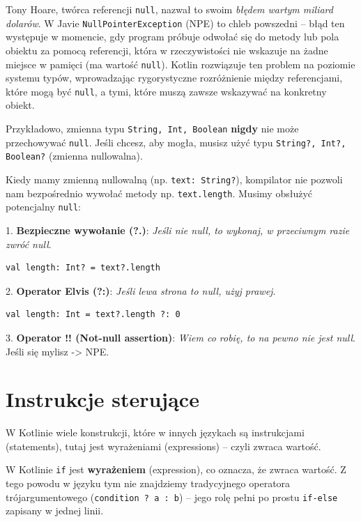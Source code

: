 Tony Hoare, twórca referencji \texttt{null}, nazwał to swoim \textit{błędem wartym miliard dolarów}. W Javie \texttt{NullPointerException} (NPE) to chleb powszedni – błąd ten występuje w momencie, gdy program próbuje odwołać się do metody lub pola obiektu za pomocą referencji, która w rzeczywistości nie wskazuje na żadne miejsce w pamięci (ma wartość \texttt{null}). Kotlin rozwiązuje ten problem na poziomie systemu typów, wprowadzając rygorystyczne rozróżnienie między referencjami, które mogą być \texttt{null}, a tymi, które muszą zawsze wskazywać na konkretny obiekt.

Przykładowo, zmienna typu \texttt{String, Int, Boolean} \textbf{nigdy} nie może przechowywać \texttt{null}. Jeśli chcesz, aby mogła, musisz użyć typu \texttt{String?, Int?, Boolean?} (zmienna nullowalna).

Kiedy mamy zmienną nullowalną (np. \texttt{text: String?}), kompilator nie pozwoli nam bezpośrednio wywołać metody np. \texttt{text.length}. Musimy obsłużyć potencjalny \texttt{null}:

1. \textbf{Bezpieczne wywołanie (?.)}: \textit{Jeśli nie null, to wykonaj, w przeciwnym razie zwróć null}.
\begin{verbatim}
val length: Int? = text?.length
\end{verbatim}

2. \textbf{Operator Elvis (?:)}: \textit{Jeśli lewa strona to null, użyj prawej}.
\begin{verbatim}
val length: Int = text?.length ?: 0
\end{verbatim}

3. \textbf{Operator !! (Not-null assertion)}: \textit{Wiem co robię, to na pewno nie jest null}. Jeśli się mylisz -> NPE.

\section{Instrukcje sterujące}

W Kotlinie wiele konstrukcji, które w innych językach są instrukcjami (statements), tutaj jest wyrażeniami (expressions) – czyli zwraca wartość.

W Kotlinie \texttt{if} jest \textbf{wyrażeniem} (expression), co oznacza, że zwraca wartość. Z tego powodu w języku tym nie znajdziemy tradycyjnego operatora trójargumentowego (\texttt{condition ? a : b}) – jego rolę pełni po prostu \texttt{if-else} zapisany w jednej linii.

